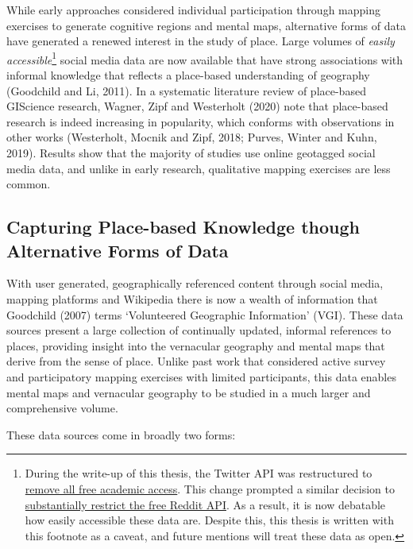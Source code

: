 \documentclass[
  letterpaper,
  11pt,
  english,
  onehalfspacing,
  headsepline]{MastersDoctoralThesis}
\begin{document}
While early approaches considered individual participation through
mapping exercises to generate cognitive regions and mental maps,
alternative forms of data have generated a renewed interest in the study
of place. Large volumes of \emph{easily accessible}\footnote{During the
  write-up of this thesis, the Twitter API was restructured to
  \href{https://x.com/XDevelopers/status/1621026986784337922?s=20}{remove
  all free academic access}. This change prompted a similar decision to
  \href{https://www.redditinc.com/blog/apifacts}{substantially restrict
  the free Reddit API}. As a result, it is now debatable how easily
  accessible these data are. Despite this, this thesis is written with
  this footnote as a caveat, and future mentions will treat these data
  as open.} social media data are now available that have strong
associations with informal knowledge that reflects a place-based
understanding of geography (Goodchild and Li, 2011). In a systematic
literature review of place-based GIScience research, Wagner, Zipf and
Westerholt (2020) note that place-based research is indeed increasing in
popularity, which conforms with observations in other works (Westerholt,
Mocnik and Zipf, 2018; Purves, Winter and Kuhn, 2019). Results show that
the majority of studies use online geotagged social media data, and
unlike in early research, qualitative mapping exercises are less common.

\hypertarget{capturing-place-based-knowledge-though-alternative-forms-of-data}{%
\subsection{Capturing Place-based Knowledge though Alternative Forms of
Data}\label{capturing-place-based-knowledge-though-alternative-forms-of-data}}

With user generated, geographically referenced content through social
media, mapping platforms and Wikipedia there is now a wealth of
information that Goodchild (2007) terms `Volunteered Geographic
Information' (VGI). These data sources present a large collection of
continually updated, informal references to places, providing insight
into the vernacular geography and mental maps that derive from the sense
of place. Unlike past work that considered active survey and
participatory mapping exercises with limited participants, this data
enables mental maps and vernacular geography to be studied in a much
larger and comprehensive volume.

These data sources come in broadly two forms:
\end{document}
